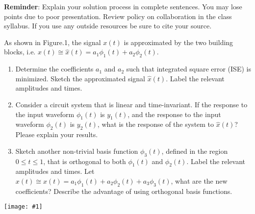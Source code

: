 \documentclass[12pt,letterpaper]{hmcpset}
\newcommand{\diagram}[2]{\begin{center}\texttt{[image: \#1]}\end{center}}
\begin{document}
	

\textbf{Reminder}: Explain your solution process in complete sentences. You may lose points due to
poor presentation. Review policy on collaboration in the class syllabus. If you use any outside
resources be sure to cite your source.

\begin{problem}[1]
	 As shown in Figure.1, the signal $x(t)$ is approximated by the two building blocks, i.e. $x(t) \cong \widehat{x}(t) = a_1 \phi_1 (t) + a_2 \phi_2 (t)$.
	 \begin{enumerate}
	 	\item Determine the coefficients $a_1$ and $a_2$ such that integrated square error (ISE) is
	 	minimized. Sketch the approximated signal $\widehat{x}(t)$. Label the relevant amplitudes and
	 	times.
	 	
	 	\item Consider a circuit system that is linear and time-invariant. If the response to the input
	 	waveform $\phi_1 (t)$ is $y_1 (t)$, and the response to the input waveform $\phi_2 (t)$ is $y_2 (t)$, what
	 	is the response of the system to $\widehat{x}(t)$? Please explain your results.
	 	
	 	\item Sketch another non-trivial basis function $\phi_3 (t)$, defined in the region $0 \leq t \leq 1$, that is orthogonal to both $\phi_1 (t)$ and $\phi_2 (t)$. Label the relevant amplitudes and times. Let $x(t) \cong \widehat{x}(t) = a_1 \phi_1 (t) + a_2 \phi_2 (t) + a_3 \phi_3 (t)$, what are the new coefficients? Describe the advantage of using orthogonal basis functions.
	 \end{enumerate} 
	 \diagram{Figure_1}{4.75}
\end{problem}

\begin{solution}
\vfill
\end{solution}

\afterpage{\null\newpage}
\end{document}
